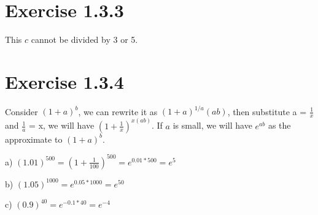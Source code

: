 \documentclass{article}
\begin{document}
\section{Exercise 1.3.3}

This $c$ cannot be divided by 3 or 5. 

\section{Exercise 1.3.4}

Consider $(1+a)^b$, we can rewrite it as $(1+a)^{1/a}(ab)$, then substitute a = $\frac{1}{x}$ and $\frac{1}{a}$ = x, we will have $(1+\frac{1}{x})^{x(ab)}$. If $a$ is small, we will have $e^{ab}$ as the approximate to $(1+a)^b$. 

a) $(1.01)^{500} = (1 + \frac{1}{100})^{500} = e^{0.01*500} = e^{5}$

b) $(1.05)^{1000} =e^{0.05*1000}=e^{50}$

c) $(0.9)^{40}=e^{-0.1 * 40}=e^{-4}$

\end{document}
